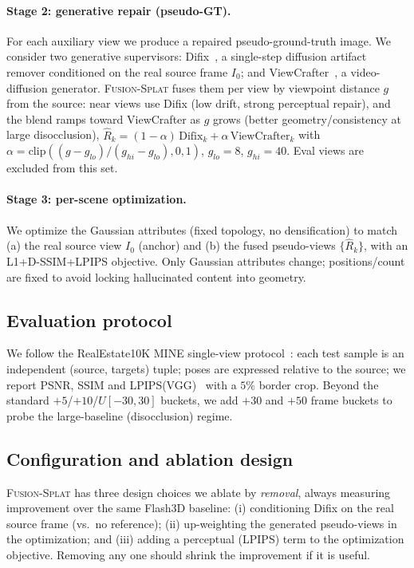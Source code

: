 \documentclass[10pt,twocolumn,letterpaper]{article}
\newcommand{\method}{\textsc{Fusion-Splat}}
\begin{document}
\paragraph{Stage 2: generative repair (pseudo-GT).}
For each auxiliary view we produce a repaired pseudo-ground-truth image. We
consider two generative supervisors: Difix~\cite{difix}, a single-step diffusion
artifact remover conditioned on the real source frame $I_0$; and
ViewCrafter~\cite{viewcrafter}, a video-diffusion generator. \method{} fuses
them per view by viewpoint distance $g$ from the source: near views use Difix
(low drift, strong perceptual repair), and the blend ramps toward ViewCrafter as
$g$ grows (better geometry/consistency at large disocclusion),
$\hat{R}_k = (1-\alpha)\,\text{Difix}_k + \alpha\,\text{ViewCrafter}_k$ with
$\alpha=\mathrm{clip}((g-g_{lo})/(g_{hi}-g_{lo}),0,1)$, $g_{lo}{=}8$,
$g_{hi}{=}40$. Eval views are excluded from this set.

\paragraph{Stage 3: per-scene optimization.}
We optimize the Gaussian attributes (fixed topology, no densification) to match
(a) the real source view $I_0$ (anchor) and (b) the fused pseudo-views
$\{\hat{R}_k\}$, with an L1+D-SSIM+LPIPS objective. Only Gaussian attributes
change; positions/count are fixed to avoid locking hallucinated content into
geometry.

\subsection{Evaluation protocol}
We follow the RealEstate10K MINE single-view
protocol~\cite{mine,flash3d}: each test sample is an independent
(source, targets) tuple; poses are expressed relative to the source; we report
PSNR, SSIM and LPIPS(VGG)~\cite{lpips} with a $5\%$ border crop. Beyond the
standard $+5$/$+10$/$U[-30,30]$ buckets, we add $+30$ and $+50$ frame buckets to
probe the large-baseline (disocclusion) regime.

\subsection{Configuration and ablation design}
\method{} has three design choices we ablate by \emph{removal}, always measuring
improvement over the same Flash3D baseline: (i) conditioning Difix on the real
source frame (vs.\ no reference); (ii) up-weighting the generated pseudo-views in
the optimization; and (iii) adding a perceptual (LPIPS) term to the optimization
objective. Removing any one should shrink the improvement if it is useful.
\end{document}
